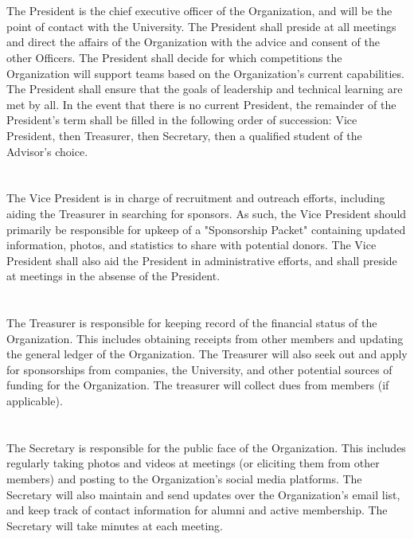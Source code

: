 \documentclass[12pt]{cls/constitution}
\begin{document}
\section{}
The President is the chief executive officer of the Organization, and will be the point of contact with the University. The President shall preside at all meetings and direct the affairs of the Organization with the advice and consent of the other Officers. The President shall decide for which competitions the Organization will support teams based on the Organization's current capabilities. The President shall ensure that the goals of leadership and technical learning are met by all. In the event that there is no current President, the remainder of the President’s term shall be filled in the following order of succession:  Vice President, then Treasurer, then Secretary, then a qualified student of the Advisor’s choice.

\section{}
The Vice President is in charge of recruitment and outreach efforts, including aiding the Treasurer in searching for sponsors. As such, the Vice President should primarily be responsible for upkeep of a "Sponsorship Packet" containing updated information, photos, and statistics to share with potential donors. The Vice President shall also aid the President in administrative efforts, and shall preside at meetings in the absense of the President.

\section{}
The Treasurer is responsible for keeping record of the financial status of the Organization. This includes obtaining receipts from other members and updating the general ledger of the Organization. The Treasurer will also seek out and apply for sponsorships from companies, the University, and other potential sources of funding for the Organization. The treasurer will collect dues from members (if applicable).

\section{}
The Secretary is responsible for the public face of the Organization. This includes regularly taking photos and videos at meetings (or eliciting them from other members) and posting to the Organization's social media platforms. The Secretary will also maintain and send updates over the Organization's email list, and keep track of contact information for alumni and active membership. The Secretary will take minutes at each meeting.
\end{document}
